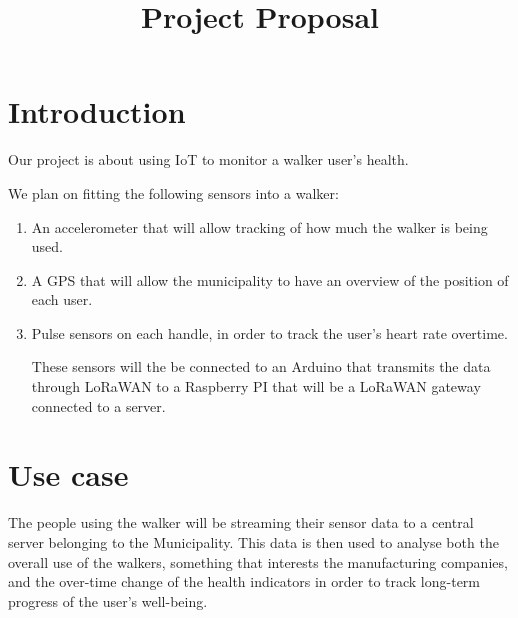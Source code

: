 \documentclass[conference]{IEEEtran}
\begin{document}
\title{Project Proposal}

\author{
\and
{}
\and
{}
}

\maketitle

\section{Introduction}
Our project is about using IoT to monitor a walker user's health. 

We plan on fitting the following sensors into a walker:
\begin{enumerate}
	\item An accelerometer that will allow tracking of how much the walker is being used.
	\item A GPS that will allow the municipality to have an overview of the position of each user.
	\item Pulse sensors on each handle, in order to track the user's heart rate overtime.
	
These sensors will the be connected to an Arduino that transmits the data through LoRaWAN to a Raspberry PI that will be a LoRaWAN gateway connected to a server.
\end{enumerate}	

 	

\section{Use case}
	The people using the walker will be streaming their sensor data to a central server belonging to the Municipality. This data is then used to analyse both the overall use of the walkers, something that interests the manufacturing companies, and the over-time change of the health indicators in order to track long-term progress of the user's well-being.
\end{document}
